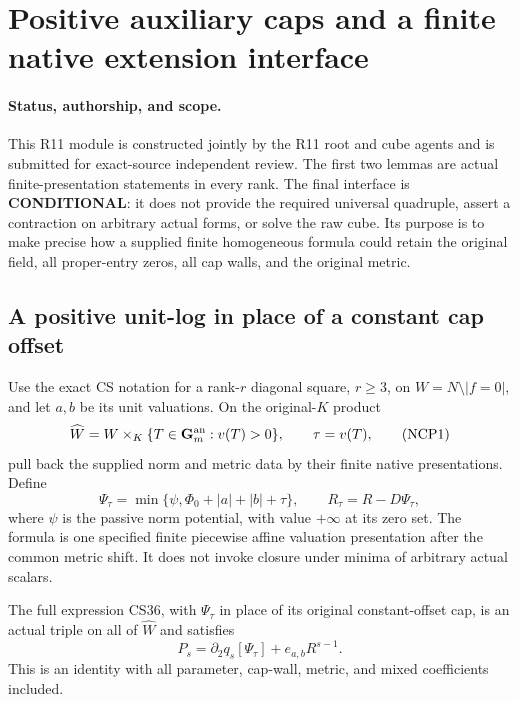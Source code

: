 \section{Positive auxiliary caps and a finite native extension interface}
\label{sec:r11-native-capped-presentation}

\paragraph{Status, authorship, and scope.}
This R11 module is constructed jointly by the R11 root and cube
agents and is submitted for exact-source independent review.
The first two lemmas
are actual finite-presentation statements in every rank.  The final
interface is \textbf{CONDITIONAL}: it does not provide the required
universal quadruple, assert a contraction on arbitrary actual forms,
or solve the raw cube.  Its purpose is to make precise how a supplied
finite homogeneous formula could retain the original field, all
proper-entry zeros, all cap walls, and the original metric.

\subsection{A positive unit-log in place of a constant cap offset}

Use the exact CS notation for a rank-$r$ diagonal square, $r\ge3$,
on $W=N\setminus|f=0|$, and let $a,b$ be its unit valuations.
On the original-$K$ product
\[
 \widehat W=W\times_K\{T\in\mathbf G_m^{\rm an}:v(T)>0\},
 \qquad \tau=v(T),
 \tag{NCP1}
\]
pull back the supplied norm and metric data by their finite native
presentations.  Define
\[
 \Psi_\tau=\min\{\psi,\Phi_0+|a|+|b|+\tau\},\qquad
 R_\tau=R-D\Psi_\tau,
 \tag{NCP2}
\]
where $\psi$ is the passive norm potential, with value $+\infty$
at its zero set.  The formula is one specified finite piecewise
affine valuation presentation after the common metric shift.  It
does not invoke closure under minima of arbitrary actual scalars.

\begin{lemma}
The full expression CS36, with $\Psi_\tau$ in place of its original
constant-offset cap, is an actual triple on all of $\widehat W$ and
satisfies
\[
 P_s=\partial_2q_s[\Psi_\tau]+e_{a,b}R^{s-1}.
 \tag{NCP3}
\]
This is an identity with all parameter, cap-wall, metric, and mixed
coefficients included.
\end{lemma}

